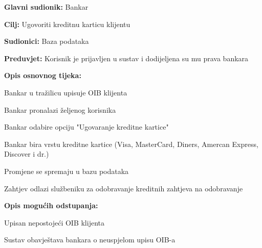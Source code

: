                 
                \noindent {}
                \begin{packed_item}
                
                  \item \textbf{Glavni sudionik: }Bankar
                  \item  \textbf{Cilj:} Ugovoriti kreditnu karticu klijentu
                  \item  \textbf{Sudionici:} Baza podataka
                  \item  \textbf{Preduvjet:} Korisnik je prijavljen u sustav i dodijeljena su mu prava bankara
                  \item  \textbf{Opis osnovnog tijeka:}
                  
                  \item[] \begin{packed_enum}
                
                	\item Bankar u tražilicu upisuje OIB klijenta
                	\item Bankar pronalazi željenog korisnika
                    \item Bankar odabire opciju "Ugovaranje kreditne kartice"
                    \item Bankar bira vrstu kreditne kartice (Visa, MasterCard, Diners, Amercan Express, Discover i dr.)
                    \item Promjene se spremaju u bazu podataka
                    \item Zahtjev odlazi službeniku za odobravanje kreditnih zahtjeva na odobravanje
                  \end{packed_enum}
                  
                  \item  \textbf{Opis mogućih odstupanja:}
                  
                  \item[] \begin{packed_item}
                
                    \item[1.a] Upisan nepostojeći OIB klijenta
                    \item[] \begin{packed_enum}
                      
                      \item Sustav obavještava bankara o neuspjelom upisu OIB-a
                      
                    \end{packed_enum}
                    
                  \end{packed_item}
                \end{packed_item}
            
